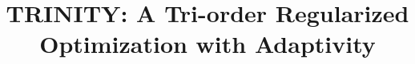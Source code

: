 \documentclass[conference]{IEEEtran}
\begin{document}
\title{TRINITY: A Tri-order Regularized Optimization with Adaptivity}


\maketitle
\end{document}
